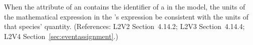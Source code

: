 When the  attribute of an \EventAssignment
contains the identifier of a \Species in the model, the
units of the mathematical expression in the
\EventAssignment's  expression  be
consistent with the units of that species' quantity.
(References: L2V2 Section~4.14.2; L2V3 Section~4.14.4; L2V4 Section~\ref{sec:eventassignment}.)
